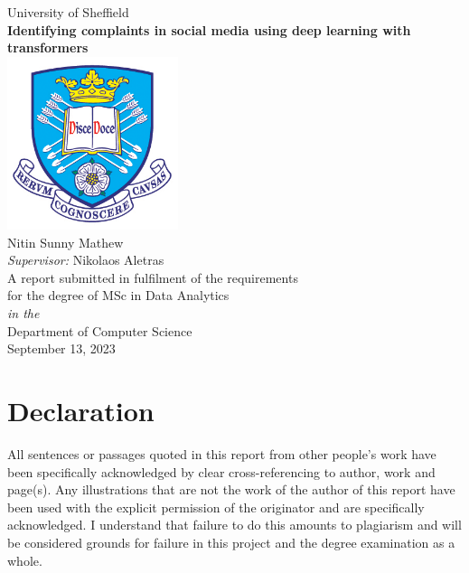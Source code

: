 \documentclass[11pt,oneside]{book}
\begin{document}
\frontmatter

\begin{titlepage}


    \begin{center}
        {\LARGE University of Sheffield}\\[1.5cm]
        \linespread{1.2}\huge {\bfseries Identifying complaints in social media using deep learning with transformers}\\[1.5cm]
        \linespread{1}
        \includegraphics[width=5cm]{images/tuoslogo.png}\\[1cm]
        {\Large Nitin Sunny Mathew}\\[1cm]
        {\large \emph{Supervisor:} Nikolaos Aletras}\\[1cm]
        \large A report submitted in fulfilment of the requirements\\ for the degree of MSc in Data Analytics\\[0.3cm]
        \textit{in the}\\[0.3cm]
        Department of Computer Science\\[2cm]
        September 13, 2023
    \end{center}

\end{titlepage}


\newpage
\chapter*{\Large Declaration}


All sentences or passages quoted in this report from other people's work have been specifically acknowledged by clear cross-referencing to author, work and page(s). Any illustrations that are not the work of the author of this report have been used with the explicit permission of the originator and are specifically acknowledged. I understand that failure to do this amounts to plagiarism and will be considered grounds for failure in this project and the degree examination as a whole.\\[1cm]
\end{document}
